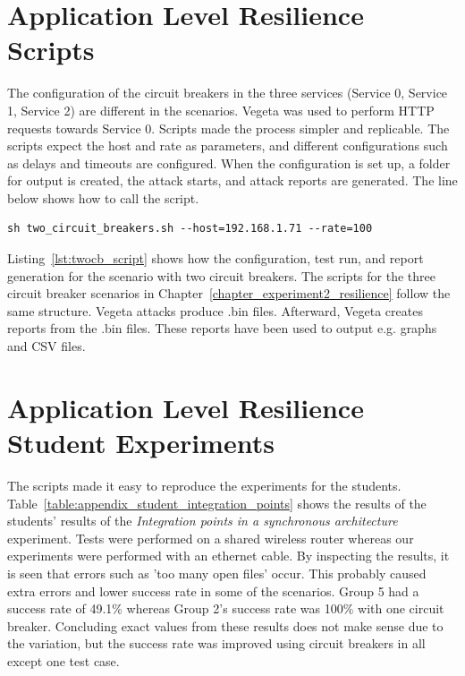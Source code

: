 \section*{Application Level Resilience Scripts}
The configuration of the circuit breakers in the three services (Service 0, Service 1, Service 2) are different in the scenarios. Vegeta was used to perform HTTP requests towards Service 0. Scripts made the process simpler and replicable. The scripts expect the host and rate as parameters, and different configurations such as delays and timeouts are configured. When the configuration is set up, a folder for output is created, the attack starts, and attack reports are generated. The line below shows how to call the script.


\begin{lstlisting}
sh two_circuit_breakers.sh --host=192.168.1.71 --rate=100
\end{lstlisting}
\noindent
Listing~\ref{lst:twocb_script} shows how the configuration, test run, and report generation for the scenario with two circuit breakers. The scripts for the three circuit breaker scenarios in Chapter~\ref{chapter_experiment2_resilience} follow the same structure. Vegeta attacks produce .bin files. Afterward, Vegeta creates reports from the .bin files. These reports have been used to output e.g. graphs and CSV files.




\section*{Application Level Resilience Student Experiments}
The scripts made it easy to reproduce the experiments for the students. Table~\ref{table:appendix_student_integration_points} shows the results of the students' results of the \textit{Integration points in a synchronous architecture} experiment. Tests were performed on a shared wireless router whereas our experiments were performed with an ethernet cable. By inspecting the results, it is seen that errors such as 'too many open files' occur. This probably caused extra errors and lower success rate in some of the scenarios. Group 5 had a success rate of 49.1\% whereas Group 2's success rate was 100\% with one circuit breaker. Concluding exact values from these results does not make sense due to the variation, but the success rate was improved using circuit breakers in all except one test case.

